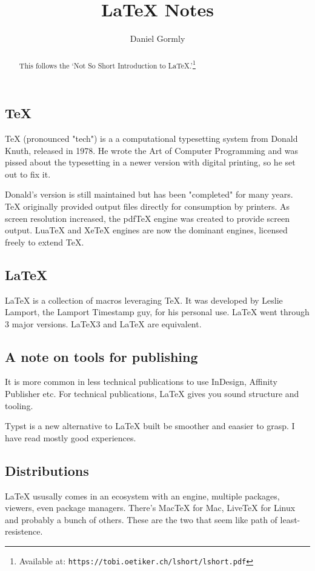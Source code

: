 \documentclass{article}
\author{Daniel Gormly}
\title{LaTeX Notes}
\begin{document}
\maketitle
\begin{abstract}
This follows the `Not So Short Introduction to LaTeX.'\footnote{Available at: \texttt{https://tobi.oetiker.ch/lshort/lshort.pdf}}
\end{abstract}

\subsection{TeX}

TeX (pronounced "tech") is a a computational typesetting system from Donald Knuth, released in 1978. He wrote the Art of Computer Programming and was pissed about the typesetting in a newer version with digital printing, so he set out to fix it.

Donald's version is still maintained but has been "completed" for many years. TeX originally provided output files directly for consumption by printers. As screen resolution increased, the pdfTeX engine was created to provide screen output. LuaTeX and XeTeX engines are now the dominant engines, licensed freely to extend TeX.

\subsection{LaTeX}

LaTeX is a collection of macros leveraging TeX. It was developed by Leslie Lamport, the Lamport Timestamp guy, for his personal use. LaTeX went through 3 major versions. LaTeX3 and LaTeX are equivalent.

\subsection{A note on tools for publishing}
It is more common in less technical publications to use InDesign, Affinity Publisher etc. For technical publications, LaTeX gives you sound structure and tooling.

Typst is a new alternative to LaTeX built be smoother and eaasier to grasp. I have read mostly good experiences.

\subsection{Distributions}
LaTeX ususally comes in an ecosystem with an engine, multiple packages, viewers, even package managers. There's MacTeX for Mac, LiveTeX for Linux and probably a bunch of others. These are the two that seem like path of least-resistence.
\end{document}
